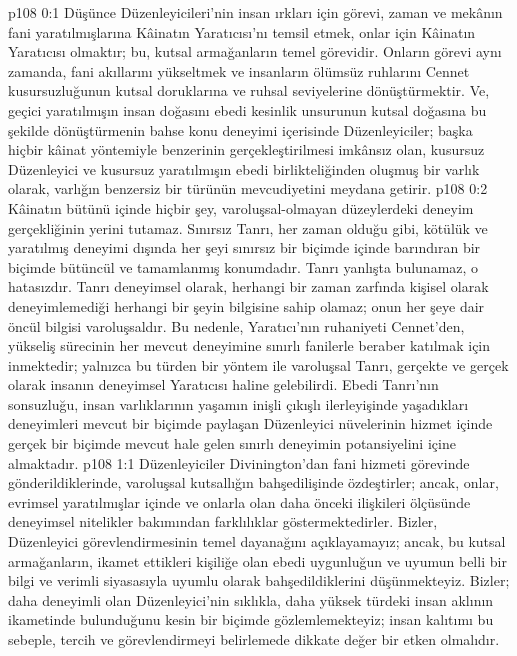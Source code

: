 \vs p108 0:1 Düşünce Düzenleyicileri’nin insan ırkları için görevi, zaman ve mekânın fani yaratılmışlarına Kâinatın Yaratıcısı’nı temsil etmek, onlar için Kâinatın Yaratıcısı olmaktır; bu, kutsal armağanların temel görevidir. Onların görevi aynı zamanda, fani akıllarını yükseltmek ve insanların ölümsüz ruhlarını Cennet kusursuzluğunun kutsal doruklarına ve ruhsal seviyelerine dönüştürmektir. Ve, geçici yaratılmışın insan doğasını ebedi kesinlik unsurunun kutsal doğasına bu şekilde dönüştürmenin bahse konu deneyimi içerisinde Düzenleyiciler; başka hiçbir kâinat yöntemiyle benzerinin gerçekleştirilmesi imkânsız olan, kusursuz Düzenleyici ve kusursuz yaratılmışın ebedi birlikteliğinden oluşmuş bir varlık olarak, varlığın benzersiz bir türünün mevcudiyetini meydana getirir.
\vs p108 0:2 Kâinatın bütünü içinde hiçbir şey, varoluşsal\hyp{}olmayan düzeylerdeki deneyim gerçekliğinin yerini tutamaz. Sınırsız Tanrı, her zaman olduğu gibi, kötülük ve yaratılmış deneyimi dışında her şeyi sınırsız bir biçimde içinde barındıran bir biçimde bütüncül ve tamamlanmış konumdadır. Tanrı yanlışta bulunamaz, o hatasızdır. Tanrı deneyimsel olarak, herhangi bir zaman zarfında kişisel olarak deneyimlemediği herhangi bir şeyin bilgisine sahip olamaz; onun her şeye dair öncül bilgisi varoluşsaldır. Bu nedenle, Yaratıcı’nın ruhaniyeti Cennet’den, yükseliş sürecinin her mevcut deneyimine sınırlı fanilerle beraber katılmak için inmektedir; yalnızca bu türden bir yöntem ile varoluşsal Tanrı, gerçekte ve gerçek olarak insanın deneyimsel Yaratıcısı haline gelebilirdi. Ebedi Tanrı’nın sonsuzluğu, insan varlıklarının yaşamın inişli çıkışlı ilerleyişinde yaşadıkları deneyimleri mevcut bir biçimde paylaşan Düzenleyici nüvelerinin hizmet içinde gerçek bir biçimde mevcut hale gelen sınırlı deneyimin potansiyelini içine almaktadır.
\vs p108 1:1 Düzenleyiciler Divinington’dan fani hizmeti görevinde gönderildiklerinde, varoluşsal kutsallığın bahşedilişinde özdeştirler; ancak, onlar, evrimsel yaratılmışlar içinde ve onlarla olan daha önceki ilişkileri ölçüsünde deneyimsel nitelikler bakımından farklılıklar göstermektedirler. Bizler, Düzenleyici görevlendirmesinin temel dayanağını açıklayamayız; ancak, bu kutsal armağanların, ikamet ettikleri kişiliğe olan ebedi uygunluğun ve uyumun belli bir bilgi ve verimli siyasasıyla uyumlu olarak bahşedildiklerini düşünmekteyiz. Bizler; daha deneyimli olan Düzenleyici’nin sıklıkla, daha yüksek türdeki insan aklının ikametinde bulunduğunu kesin bir biçimde gözlemlemekteyiz; insan kalıtımı bu sebeple, tercih ve görevlendirmeyi belirlemede dikkate değer bir etken olmalıdır.
